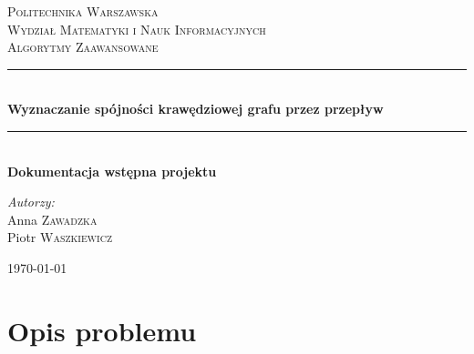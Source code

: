 \documentclass{article}
\begin{document}
	
\begin{titlepage}

\newcommand{\HRule}{\rule{\linewidth}{0.5mm}}

\center


\textsc{\LARGE Politechnika Warszawska}\\[5mm]
\textsc{\LARGE Wydział Matematyki i Nauk Informacyjnych}\\[4cm]
 

\textsc{\Huge Algorytmy Zaawansowane}\\[0.5cm]


\HRule \\[0.4cm]
{ \LARGE \bfseries Wyznaczanie spójności krawędziowej grafu przez przepływ}\\[0.2cm]
 

\HRule \\[0.4cm]
{  \bfseries Dokumentacja wstępna projektu}\\[2.5cm]
 

\begin{flushright}
\Large \emph{Autorzy:}\\[0.5cm]
Anna \textsc{Zawadzka}\\
Piotr \textsc{Waszkiewicz}\\
\end{flushright}

\vfill
{\large \today}\\[3cm]

\end{titlepage}
	
\newpage

\section{Opis problemu}
\end{document}
